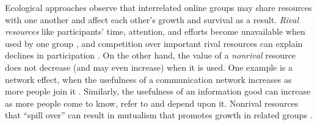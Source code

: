 \documentclass[letterpaper]{article}\usepackage[]{graphicx}\usepackage[]{color}
\begin{document}

Ecological approaches observe that interrelated online groups may share resources with one another and affect each other's growth and survival as a result.  \textit{Rival resources} like participants' time, attention, and efforts become unavailable when used by one group \cite{benkler_wealth_2006, romer_endogenous_1990}, and competition over important rival resources can explain declines in participation \cite{wang_impact_2012}. 
On the other hand, the value of a \textit{nonrival} resource does not decrease (and may even increase) when it is used. 
One example is a network effect, when the usefulness of a communication network increases as more people join it \cite{fulk_connective_1996}. Similarly, the usefulness of an information good can increase as more people come to know, refer to and depend upon it.
Nonrival resources that ``spill over'' can result in mutualism that promotes growth in related groups   \cite{zhu_impact_2014}.   

 
 




%
\end{document}
